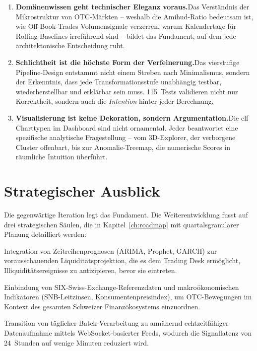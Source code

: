 \documentclass[11pt, a4paper, oneside, openany]{report}
\begin{document}
\begin{enumerate}[label=\textcolor{MetricBlue}{\textbf{(\roman*)}}]
  \item \textbf{Domänenwissen geht technischer Eleganz voraus.}\;Das Verständnis der Mikrostruktur von OTC-Märkten -- weshalb die Amihud-Ratio bedeutsam ist, wie Off-Book-Trades Volumensignale verzerren, warum Kalendertage für Rolling Baselines irreführend sind -- bildet das Fundament, auf dem jede architektonische Entscheidung ruht.
  \item \textbf{Schlichtheit ist die höchste Form der Verfeinerung.}\;Das vierstufige Pipeline-Design entstammt nicht einem Streben nach Minimalismus, sondern der Erkenntnis, dass jede Transformationsstufe unabhängig testbar, wiederherstellbar und erklärbar sein muss. 115~Tests validieren nicht nur Korrektheit, sondern auch die \emph{Intention} hinter jeder Berechnung.
  \item \textbf{Visualisierung ist keine Dekoration, sondern Argumentation.}\;Die elf Charttypen im Dashboard sind nicht ornamental. Jeder beantwortet eine spezifische analytische Fragestellung -- vom 3D-Explorer, der verborgene Cluster offenbart, bis zur Anomalie-Treemap, die numerische Scores in räumliche Intuition überführt.
\end{enumerate}

\section{Strategischer Ausblick}
\label{sec:roadmap-teaser}

Die gegenwärtige Iteration legt das Fundament. Die Weiterentwicklung fusst auf drei strategischen Säulen, die in Kapitel~\ref{ch:roadmap} mit quartalsgranularer Planung detailliert werden:

\begin{description}[style=nextline, leftmargin=1.5em]
  \item[\textcolor{SwissRed}{Säule~I\;---\;Prädiktive Analytik}]
  Integration von Zeitreihenprognosen (ARIMA, Prophet, GARCH) zur vorausschauenden Liquiditätsprojektion, die es dem Trading Desk ermöglicht, Illiquiditätsereignisse zu antizipieren, bevor sie eintreten.
  \item[\textcolor{SwissRed}{Säule~II\;---\;Marktübergreifende Anreicherung}]
  Einbindung von SIX-Swiss-Exchange-Referenzdaten und makroökonomischen Indikatoren (SNB-Leitzinsen, Konsumentenpreisindex), um OTC-Bewegungen im Kontext des gesamten Schweizer Finanzökosystems einzuordnen.
  \item[\textcolor{SwissRed}{Säule~III\;---\;Echtzeit-Streaming}]
  Transition von täglicher Batch-Verarbeitung zu annähernd echtzeitfähiger Datenaufnahme mittels WebSocket-basierter Feeds, wodurch die Signallatenz von 24~Stunden auf wenige Minuten reduziert wird.
\end{description}
\end{document}
